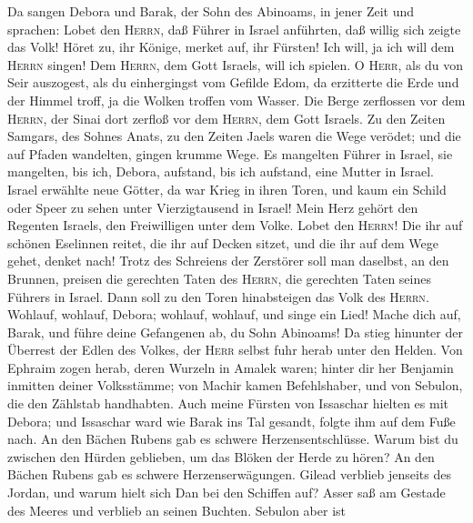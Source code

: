  Da sangen Debora und Barak, der Sohn des Abinoams, in
jener Zeit und sprachen:  Lobet den \textsc{Herrn}, daß
Führer in Israel anführten, daß willig sich zeigte das Volk!
 Höret zu, ihr Könige, merket auf, ihr Fürsten! Ich will,
ja ich will dem \textsc{Herrn} singen! Dem \textsc{Herrn}, dem Gott
Israels, will ich spielen.  O \textsc{Herr}, als du von
Seir auszogest, als du einhergingst vom Gefilde Edom, da erzitterte die
Erde und der Himmel troff, ja die Wolken troffen vom Wasser.
 Die Berge zerflossen vor dem \textsc{Herrn}, der Sinai
dort zerfloß vor dem \textsc{Herrn}, dem Gott Israels.  Zu
den Zeiten Samgars, des Sohnes Anats, zu den Zeiten Jaels waren die Wege
verödet; und die auf Pfaden wandelten, gingen krumme Wege.
 Es mangelten Führer in Israel, sie mangelten, bis ich,
Debora, aufstand, bis ich aufstand, eine Mutter in Israel.
 Israel erwählte neue Götter, da war Krieg in ihren Toren,
und kaum ein Schild oder Speer zu sehen unter Vierzigtausend in Israel!
 Mein Herz gehört den Regenten Israels, den Freiwilligen
unter dem Volke. Lobet den \textsc{Herrn}!  Die ihr auf
schönen Eselinnen reitet, die ihr auf Decken sitzet, und die ihr auf dem
Wege gehet, denket nach!  Trotz des Schreiens der
Zerstörer soll man daselbst, an den Brunnen, preisen die gerechten Taten
des \textsc{Herrn}, die gerechten Taten seines Führers in Israel. Dann
soll zu den Toren hinabsteigen das Volk des \textsc{Herrn}.
 Wohlauf, wohlauf, Debora; wohlauf, wohlauf, und singe
ein Lied! Mache dich auf, Barak, und führe deine Gefangenen ab, du Sohn
Abinoams!  Da stieg hinunter der Überrest der Edlen des
Volkes, der \textsc{Herr} selbst fuhr herab unter den Helden.
 Von Ephraim zogen herab, deren Wurzeln in Amalek waren;
hinter dir her Benjamin inmitten deiner Volksstämme; von Machir kamen
Befehlshaber, und von Sebulon, die den Zählstab handhabten.
 Auch meine Fürsten von Issaschar hielten es mit Debora;
und Issaschar ward wie Barak ins Tal gesandt, folgte ihm auf dem Fuße
nach. An den Bächen Rubens gab es schwere Herzensentschlüsse.
 Warum bist du zwischen den Hürden geblieben, um das
Blöken der Herde zu hören? An den Bächen Rubens gab es schwere
Herzenserwägungen.  Gilead verblieb jenseits des Jordan,
und warum hielt sich Dan bei den Schiffen auf? Asser saß am Gestade des
Meeres und verblieb an seinen Buchten.  Sebulon aber ist
